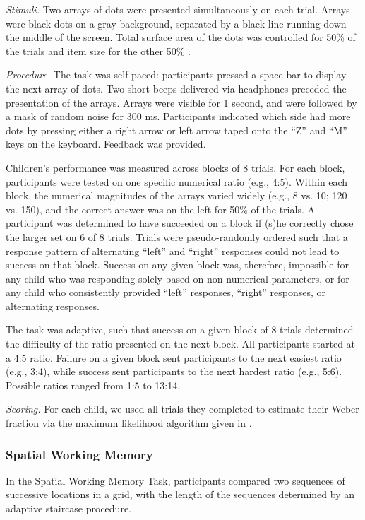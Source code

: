 \documentclass[11pt]{article}
\begin{document}
{\it Stimuli.} Two arrays of dots were presented simultaneously on each trial. Arrays were black dots on a gray background, separated by a black line running down the middle of the screen. Total surface area of the dots was controlled for 50\% of the trials and item size for the other 50\% \cite{dehaene2005}.

{\it Procedure.} The task was self-paced: participants pressed a space-bar to display the next array of dots. Two short beeps delivered via headphones preceded the presentation of the arrays. Arrays were visible for 1 second, and were followed by a mask of random noise for 300 ms. Participants indicated which side had more dots by pressing either a right arrow or left arrow taped onto the ``Z'' and ``M'' keys on the keyboard. Feedback was provided.

Children's performance was measured across blocks of 8 trials. For each block, participants were tested on one specific numerical ratio (e.g., 4:5). Within each block, the numerical magnitudes of the arrays varied widely (e.g., 8 vs. 10; 120 vs. 150), and the correct answer was on the left for 50\% of the trials. A participant was determined to have succeeded on a block if (s)he correctly chose the larger set on 6 of 8 trials. Trials were pseudo-randomly ordered such that a response pattern of alternating ``left'' and ``right'' responses could not lead to success on that block. Success on any given block was, therefore, impossible for any child who was responding solely based on non-numerical parameters, or for any child who consistently provided ``left'' responses, ``right'' responses, or alternating responses. 

The task was adaptive, such that success on a given block of 8 trials determined the difficulty of the ratio presented on the next block. All participants started at a 4:5 ratio. Failure on a given block sent participants to the next easiest ratio (e.g., 3:4), while success sent participants to the next hardest ratio (e.g., 5:6). Possible ratios ranged from 1:5 to 13:14.

{\it Scoring.} For each child, we used all trials they completed to estimate their Weber fraction via the maximum likelihood algorithm given in .

\subsubsection{Spatial Working Memory} 

In the Spatial Working Memory Task, participants compared two sequences of successive locations in a grid, with the length of the sequences determined by an adaptive staircase procedure. 
\end{document}
